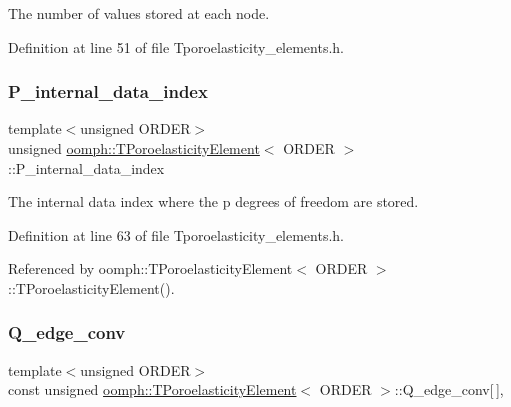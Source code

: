 The number of values stored at each node. 



Definition at line 51 of file Tporoelasticity\+\_\+elements.\+h.

\mbox{\label{classoomph_1_1TPoroelasticityElement_a982e6e841b2bc2ab02526916dbc77ca8}} 
\subsubsection{\texorpdfstring{P\+\_\+internal\+\_\+data\+\_\+index}{P\_internal\_data\_index}}
{\footnotesize\ttfamily template$<$unsigned O\+R\+D\+ER$>$ \\
unsigned \hyperlink{classoomph_1_1TPoroelasticityElement}{oomph\+::\+T\+Poroelasticity\+Element}$<$ O\+R\+D\+ER $>$\+::P\+\_\+internal\+\_\+data\+\_\+index\hspace{0.3cm}{\ttfamily [private]}}



The internal data index where the p degrees of freedom are stored. 



Definition at line 63 of file Tporoelasticity\+\_\+elements.\+h.



Referenced by oomph\+::\+T\+Poroelasticity\+Element$<$ O\+R\+D\+E\+R $>$\+::\+T\+Poroelasticity\+Element().

\mbox{\label{classoomph_1_1TPoroelasticityElement_a233a15513d26988887d35cbcaa517a0b}} 
\subsubsection{\texorpdfstring{Q\+\_\+edge\+\_\+conv}{Q\_edge\_conv}}
{\footnotesize\ttfamily template$<$unsigned O\+R\+D\+ER$>$ \\
const unsigned \hyperlink{classoomph_1_1TPoroelasticityElement}{oomph\+::\+T\+Poroelasticity\+Element}$<$ O\+R\+D\+ER $>$\+::Q\+\_\+edge\+\_\+conv\mbox{[}$\,$\mbox{]}\hspace{0.3cm}{\ttfamily [static]}, {\ttfamily [private]}}



